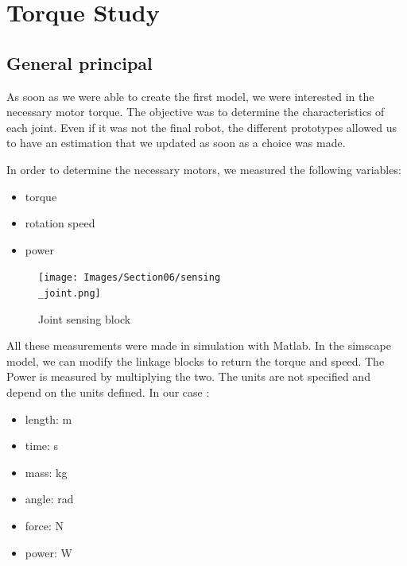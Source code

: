 \section{Torque Study}\insertloftspace
\setcounter{figure}{0}\setcounter{table}{0}

\subsection{General principal}

As soon as we were able to create the first model, we were interested in the necessary motor torque. The objective was to determine the characteristics of each joint. Even if it was not the final robot, the different prototypes allowed us to have an estimation that we updated as soon as a choice was made. 

\bigbreak
In order to determine the necessary motors, we measured the following variables:
\begin{multicols}{3}
    \begin{itemize}[noitemsep]
        \item torque
        \item rotation speed
        \item power
    \end{itemize}
\end{multicols}

\bigbreak
\begin{figure}[ht]
    \centering
    \texttt{[image: Images/Section06/sensing\\\_joint.png]}
    \caption{Joint sensing block}
    \label{fig:SensingBlock}
\end{figure}
\FloatBarrier

\bigbreak
All these measurements were made in simulation with Matlab. In the simscape model, we can modify the linkage blocks to return the torque and speed. The Power is measured by multiplying the two. The units are not specified and depend on the units defined. In our case : 
\begin{multicols}{2}
    \begin{itemize}[noitemsep]
        \item length: m
        \item time: s
        \item mass: kg
        \item angle: rad
        \item force: N
        \item power: W
    \end{itemize}
\end{multicols}

